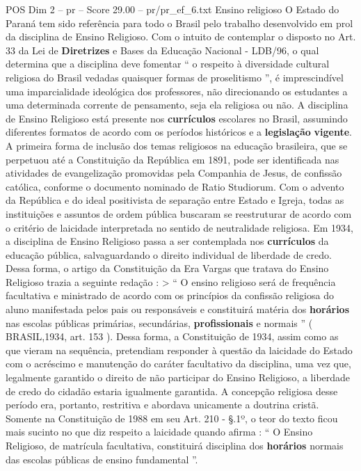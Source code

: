 \begin{textsample}{POS Dim 2 – pr – Score 29.00 – pr/pr\_ef\_6.txt}  \label{ex:f2_pos_114}
Ensino religioso O Estado do Paraná tem sido referência para todo o Brasil pelo trabalho desenvolvido em prol da disciplina de Ensino Religioso.
Com o intuito de contemplar o disposto no Art. 33 da Lei de \textbf{Diretrizes} e Bases da Educação Nacional - LDB/96, o qual determina que a disciplina deve fomentar “ o respeito à diversidade cultural religiosa do Brasil vedadas quaisquer formas de proselitismo ”, é imprescindível uma imparcialidade ideológica dos professores, não direcionando os estudantes a uma determinada corrente de pensamento, seja ela religiosa ou não.
A disciplina de Ensino Religioso está presente nos \textbf{currículos} escolares no Brasil, assumindo diferentes formatos de acordo com os períodos históricos e a \textbf{legislação} \textbf{vigente}.
A primeira forma de inclusão dos temas religiosos na educação brasileira, que se perpetuou até a Constituição da República em 1891, pode ser identificada nas atividades de evangelização promovidas pela Companhia de Jesus, de confissão católica, conforme o documento nominado de Ratio Studiorum.
Com o advento da República e do ideal positivista de separação entre Estado e Igreja, todas as instituições e assuntos de ordem pública buscaram se reestruturar de acordo com o critério de laicidade interpretada no sentido de neutralidade religiosa.
Em 1934, a disciplina de Ensino Religioso passa a ser contemplada nos \textbf{currículos} da educação pública, salvaguardando o direito individual de liberdade de credo.
Dessa forma, o artigo da Constituição da Era Vargas que tratava do Ensino Religioso trazia a seguinte redação : > “ O ensino religioso será de frequência facultativa e ministrado de acordo com os princípios da confissão religiosa do aluno manifestada pelos pais ou responsáveis e constituirá matéria dos \textbf{horários} nas escolas públicas primárias, secundárias, \textbf{profissionais} e normais ” ( BRASIL,1934, art. 153 ).
Dessa forma, a Constituição de 1934, assim como as que vieram na sequência, pretendiam responder à questão da laicidade do Estado com o acréscimo e manutenção do caráter facultativo da disciplina, uma vez que, legalmente garantido o direito de não participar do Ensino Religioso, a liberdade de credo do cidadão estaria igualmente garantida.
A concepção religiosa desse período era, portanto, restritiva e abordava unicamente a doutrina cristã.
Somente na Constituição de 1988 em seu Art. 210 - §.1º, o teor do texto ficou mais sucinto no que diz respeito a laicidade quando afirma : “ O Ensino Religioso, de matrícula facultativa, constituirá disciplina dos \textbf{horários} normais das escolas públicas de ensino fundamental ”.

\end{textsample}
